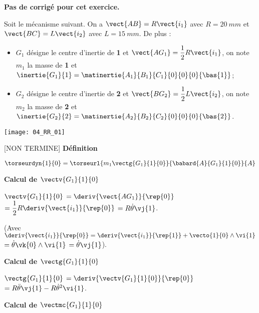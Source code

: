 \normaltrue
\correctionfalse


\setcounter{question}{0}
\ifcorrection
\else
\textbf{Pas de corrigé pour cet exercice.}
\fi

\ifprof
\else
Soit le mécanisme suivant. On a $\vect{AB}=R\vect{i_1}$ avec $R=\SI{20}{mm}$ et  
$\vect{BC}=L\vect{i_2}$ avec $L=\SI{15}{mm}$. De plus :
\begin{itemize}
\item $G_1$ désigne le centre d'inertie de \textbf{1} et $\vect{AG_1}=\dfrac{1}{2}R\vect{i_1}$, on note $m_1$ la masse de \textbf{1} et $\inertie{G_1}{1}=\matinertie{A_1}{B_1}{C_1}{0}{0}{0}{\bas{1}}$; 
\item $G_2$ désigne le centre d'inertie de \textbf{2} et $\vect{BG_2}=\dfrac{1}{2}L\vect{i_2}$, on note $m_2$ la masse de \textbf{2} et $\inertie{G_2}{2}=\matinertie{A_2}{B_2}{C_2}{0}{0}{0}{\bas{2}}$.
\end{itemize}
\begin{center}
\texttt{[image: 04\_RR\_01]}
\end{center}
\fi

\ifprof

[NON TERMINE]
\textbf{Définition}

$\torseurdyn{1}{0} = \torseurl{m_1 \vectg{G_1}{1}{0}}{\babard{A}{G_1}{1}{0}}{A}$

\textbf{Calcul de $\vectv{G_1}{1}{0}$}

$\vectv{G_1}{1}{0}$ $ = \deriv{\vect{AG_1}}{\rep{0}}$
$ = \dfrac{1}{2}R\deriv{\vect{i_1}}{\rep{0}}$
$ = R\dot{\theta}\vj{1}$.

(Avec $\deriv{\vect{i_1}}{\rep{0}} = \deriv{\vect{i_1}}{\rep{1}} + \vecto{1}{0}\wedge \vi{1}$
$ = \dot{\theta}\vk{0}\wedge \vi{1}$ $ = \dot{\theta}\vj{1}$).

\textbf{Calcul de $\vectg{G_1}{1}{0}$}

$\vectg{G_1}{1}{0}$ $ = \deriv{{\vectv{G_1}{1}{0}}}{\rep{0}}$
$ =  R\ddot{\theta}\vj{1} - R\dot{\theta}^2\vi{1} $.

\textbf{Calcul de $\vectmc{G_1}{1}{0}$}

